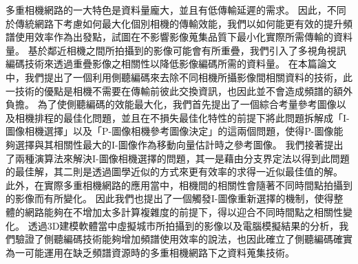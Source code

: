 多重相機網路的一大特色是資料量龐大，並且有低傳輸延遲的需求。
因此，不同於傳統網路下考慮如何最大化個別相機的傳輸效能，我們以如何能更有效的提升頻譜使用效率作為出發點，試圖在不影響影像蒐集品質下最小化實際所需傳輸的資料量。
基於鄰近相機之間所拍攝到的影像可能會有所重疊，我們引入了多視角視訊編碼技術來透過重疊影像之相關性以降低影像編碼所需的資料量。
在本篇論文中，我們提出了一個利用側聽編碼來去除不同相機所攝影像間相關資料的技術，此一技術的優點是相機不需要在傳輸前彼此交換資訊，也因此並不會造成頻譜的額外負擔。
為了使側聽編碼的效能最大化，我們首先提出了一個綜合考量參考圖像以及相機排程的最佳化問題，並且在不損失最佳化特性的前提下將此問題拆解成「I-圖像相機選擇」以及「P-圖像相機參考圖像決定」的這兩個問題，使得P-圖像能夠選擇與其相關性最大的I-圖像作為移動向量估計時之參考圖像。
我們接著提出了兩種演算法來解決I-圖像相機選擇的問題，其一是藉由分支界定法以得到此問題的最佳解，其二則是透過圖學近似的方式來更有效率的求得一近似最佳值的解。
此外，在實際多重相機網路的應用當中，相機間的相關性會隨著不同時間點拍攝到的影像而有所變化。
因此我們也提出了一個觸發I-圖像重新選擇的機制，使得整體的網路能夠在不增加太多計算複雜度的前提下，得以迎合不同時間點之相關性變化。
透過3D建模軟體當中虛擬城市所拍攝到的影像以及電腦模擬結果的分析，我們驗證了側聽編碼技術能夠增加頻譜使用效率的說法，也因此確立了側聽編碼確實為一可能運用在缺乏頻譜資源時的多重相機網路下之資料蒐集技術。
